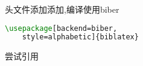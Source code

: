 头文件添加添加,编译使用biber
\begin{lstlisting}[language=tex]
\usepackage[backend=biber,
	style=alphabetic]{biblatex}
\end{lstlisting}
尝试引用\cite{github}